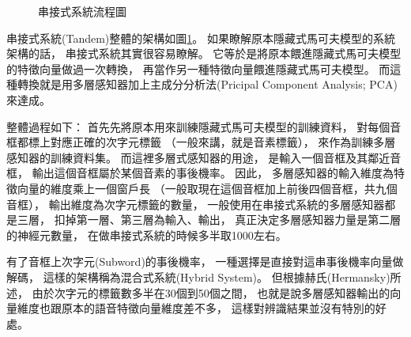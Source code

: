   \begin{figure}
    \label{fig:tandem_flow_chart}
    \caption{串接式系統流程圖}
  \end{figure}
  串接式系統(Tandem)\cite{HermanskyTandem}整體的架構如圖\ref{fig:tandem_flow_chart}。
  如果瞭解原本隱藏式馬可夫模型的系統架構的話，
  串接式系統其實很容易瞭解。
  它等於是將原本餵進隱藏式馬可夫模型的特徵向量做過一次轉換，
  再當作另一種特徵向量餵進隱藏式馬可夫模型。
  而這種轉換就是用多層感知器加上主成分分析法(Pricipal Component Analysis; PCA)來達成。
  
  整體過程如下：
  首先先將原本用來訓練隱藏式馬可夫模型的訓練資料，
  對每個音框都標上對應正確的次字元標籤
  （一般來講，就是音素標籤），
  來作為訓練多層感知器的訓練資料集。
  而這裡多層式感知器的用途，
  是輸入一個音框及其鄰近音框，
  輸出這個音框屬於某個音素的事後機率。
  因此，
  多層感知器的輸入維度為特徵向量的維度乘上一個窗戶長
  （一般取現在這個音框加上前後四個音框，共九個音框），
  輸出維度為次字元標籤的數量，
  一般使用在串接式系統的多層感知器都是三層，
  扣掉第一層、第三層為輸入、輸出，
  真正決定多層感知器力量是第二層的神經元數量，
  在做串接式系統的時候多半取1000左右。

  有了音框上次字元(Subword)的事後機率，
  一種選擇是直接對這串事後機率向量做解碼，
  這樣的架構稱為混合式系統(Hybrid System)。
  但根據赫氏(Hermansky)所述\cite{HermanskyTandem}，
  由於次字元的標籤數多半在30個到50個之間，
  也就是說多層感知器輸出的向量維度也跟原本的語音特徵向量維度差不多，
  這樣對辨識結果並沒有特別的好處。

